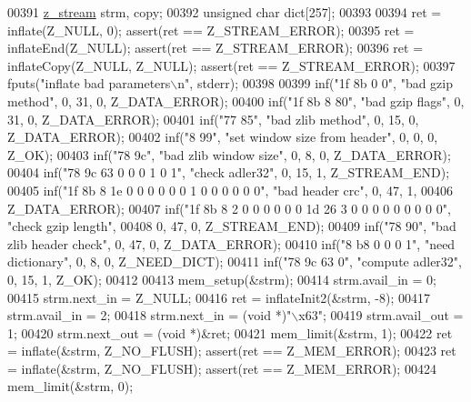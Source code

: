 \begin{DoxyCode}
{{{{{00391     \hyperlink{structz__stream__s}{z\_stream} strm, copy;
00392     \textcolor{keywordtype}{unsigned} \textcolor{keywordtype}{char} dict[257];
00393 
00394     ret = inflate(Z\_NULL, 0);                   assert(ret == Z\_STREAM\_ERROR);
00395     ret = inflateEnd(Z\_NULL);                   assert(ret == Z\_STREAM\_ERROR);
00396     ret = inflateCopy(Z\_NULL, Z\_NULL);          assert(ret == Z\_STREAM\_ERROR);
00397     fputs(\textcolor{stringliteral}{"inflate bad parameters\(\backslash\)n"}, stderr);
00398 
00399     inf(\textcolor{stringliteral}{"1f 8b 0 0"}, \textcolor{stringliteral}{"bad gzip method"}, 0, 31, 0, Z\_DATA\_ERROR);
00400     inf(\textcolor{stringliteral}{"1f 8b 8 80"}, \textcolor{stringliteral}{"bad gzip flags"}, 0, 31, 0, Z\_DATA\_ERROR);
00401     inf(\textcolor{stringliteral}{"77 85"}, \textcolor{stringliteral}{"bad zlib method"}, 0, 15, 0, Z\_DATA\_ERROR);
00402     inf(\textcolor{stringliteral}{"8 99"}, \textcolor{stringliteral}{"set window size from header"}, 0, 0, 0, Z\_OK);
00403     inf(\textcolor{stringliteral}{"78 9c"}, \textcolor{stringliteral}{"bad zlib window size"}, 0, 8, 0, Z\_DATA\_ERROR);
00404     inf(\textcolor{stringliteral}{"78 9c 63 0 0 0 1 0 1"}, \textcolor{stringliteral}{"check adler32"}, 0, 15, 1, Z\_STREAM\_END);
00405     inf(\textcolor{stringliteral}{"1f 8b 8 1e 0 0 0 0 0 0 1 0 0 0 0 0 0"}, \textcolor{stringliteral}{"bad header crc"}, 0, 47, 1,
00406         Z\_DATA\_ERROR);
00407     inf(\textcolor{stringliteral}{"1f 8b 8 2 0 0 0 0 0 0 1d 26 3 0 0 0 0 0 0 0 0 0"}, \textcolor{stringliteral}{"check gzip length"},
00408         0, 47, 0, Z\_STREAM\_END);
00409     inf(\textcolor{stringliteral}{"78 90"}, \textcolor{stringliteral}{"bad zlib header check"}, 0, 47, 0, Z\_DATA\_ERROR);
00410     inf(\textcolor{stringliteral}{"8 b8 0 0 0 1"}, \textcolor{stringliteral}{"need dictionary"}, 0, 8, 0, Z\_NEED\_DICT);
00411     inf(\textcolor{stringliteral}{"78 9c 63 0"}, \textcolor{stringliteral}{"compute adler32"}, 0, 15, 1, Z\_OK);
00412 
00413     mem\_setup(&strm);
00414     strm.avail\_in = 0;
00415     strm.next\_in = Z\_NULL;
00416     ret = inflateInit2(&strm, -8);
00417     strm.avail\_in = 2;
00418     strm.next\_in = (\textcolor{keywordtype}{void} *)\textcolor{stringliteral}{"\(\backslash\)x63"};
00419     strm.avail\_out = 1;
00420     strm.next\_out = (\textcolor{keywordtype}{void} *)&ret;
00421     mem\_limit(&strm, 1);
00422     ret = inflate(&strm, Z\_NO\_FLUSH);           assert(ret == Z\_MEM\_ERROR);
00423     ret = inflate(&strm, Z\_NO\_FLUSH);           assert(ret == Z\_MEM\_ERROR);
00424     mem\_limit(&strm, 0);
}}}}}
\end{DoxyCode}
